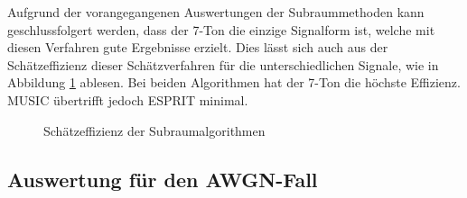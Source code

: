 Aufgrund der vorangegangenen Auswertungen der Subraummethoden kann geschlussfolgert werden, dass der 7-Ton die einzige Signalform ist, welche mit diesen Verfahren gute Ergebnisse erzielt. Dies lässt sich auch aus der Schätzeffizienz dieser Schätzverfahren für die unterschiedlichen Signale, wie in Abbildung \ref{fig:Schätzeffizienz_Subraum} ablesen. Bei beiden Algorithmen hat der 7-Ton die höchste Effizienz. \gls{MUSIC} übertrifft jedoch \gls{ESPRIT} minimal.

\begin{figure}[htbp]
	\centering
	
	\caption{Schätzeffizienz der Subraumalgorithmen}
	\label{fig:Schätzeffizienz_Subraum}	
\end{figure}



\subsection{Auswertung für den \gls{AWGN}-Fall}

